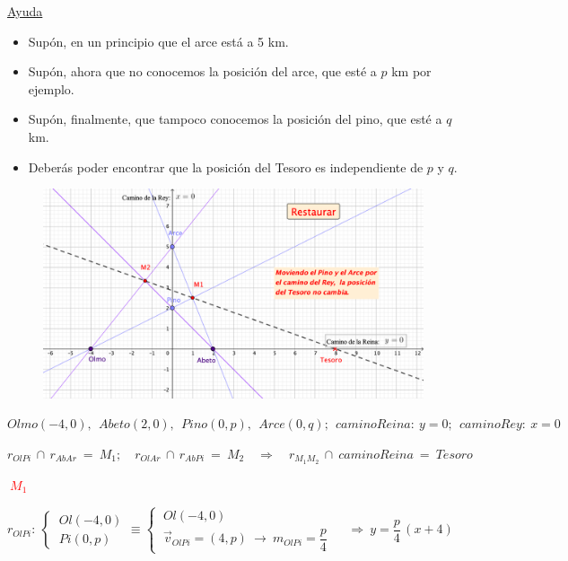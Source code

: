 \vspace{5mm}
\color{gris}
\underline{Ayuda}
\begin{itemize}
\item Supón, en un principio que el arce está a 5 km.
\item Supón, ahora que no conocemos la posición del arce, que esté a $p$ km por ejemplo.
\item Supón, finalmente, que tampoco conocemos la posición del pino, que esté a $q$ km.
\item Deberás poder encontrar que la posición del Tesoro es independiente de $p$ y $q$.	
\end{itemize}
\color{black}

\begin{figure}[H]
	\centering
	\includegraphics[width=1\textwidth]{img-ga/puntosmagicos.png}
\end{figure}

$Olmo(-4,0),\ \ Abeto(2,0),\ \ Pino(0,p),\ \ Arce(0,q);\ \  camino Reina: \ y=0;\ \ camino Rey:\ x=0$

$r_{OlPi} \, \cap \, r_{AbAr} \ = \ M_1;\quad r_{OlAr}\, \cap \, r_{AbPi} \ = \ M_2 \quad \Rightarrow \quad r_{M_1M_2} \, \cap \ camino Reina \ = \ Tesoro$


\vspace{10mm} 

\textcolor{red}{$\boxed{\ M_1 \ }$}

$r_{OlPi}:\ \begin{cases} \ Ol(-4,0)\\ \ Pi(0,p)\end{cases} \equiv \begin{cases} \ Ol(-4,0)\\ \ \vec v_{OlPi}=(4,p) \ \to \ m_{OlPi}=\dfrac p 4 \end{cases}
 \quad \ \Rightarrow \ y=\dfrac p 4 \, (x+4)$
 
